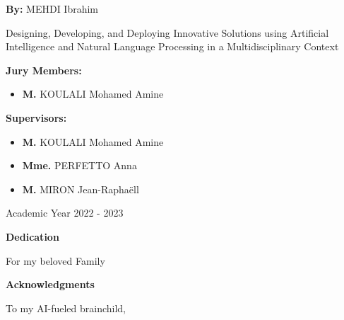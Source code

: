 \documentclass[a4paper,12pt,twoside]{report}
\begin{document}
\begin{titlepage}
\vfill

\begin{center}
\textbf{By:}
    MEHDI Ibrahim

\end{center}

\vfill

\begin{center}
    \hrulefill\par
    \LARGE Designing, Developing, and Deploying Innovative Solutions using Artificial Intelligence and Natural Language Processing in a Multidisciplinary Context\par
    \hrulefill\par
\end{center}



\begin{multicols}{2}
\noindent \textbf{Jury Members:}
\begin{itemize}[label=\textbullet, leftmargin=*]
  \item \textbf{M.} KOULALI Mohamed Amine
\end{itemize}

\columnbreak

\noindent \textbf{Supervisors:}
\begin{itemize}[label=\textbullet, leftmargin=*]
  \item \textbf{M.} KOULALI Mohamed Amine
  \item \textbf{Mme.} PERFETTO Anna
  \item \textbf{M.} MIRON Jean-Raphaëll
\end{itemize}

\end{multicols}

\begin{center}
    Academic Year 2022 - 2023
\end{center}

\end{titlepage}

\newpage

\begin{center}
    \Large{\textbf{Dedication}}
\end{center}


\begin{center}
    \Large{For my beloved Family}
\end{center}
\newpage
\thispagestyle{empty}
\begin{center}
    \Large\textbf{Acknowledgments}
\end{center}
To my AI-fueled brainchild,
\end{document}
